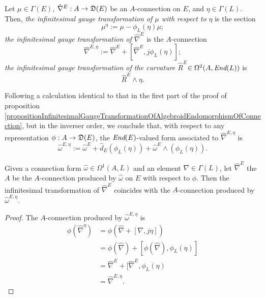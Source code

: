 \begin{definition}\label{definitionInfinitesimalGaugeActionAndTransformationAConnection}
Let $\mu \in \Gamma(E)$, $\hat \nabla^E: A \to \mathfrak{D}(E)$ be an $A$-connection on $E$, and $\eta \in \Gamma(L)$. Then, \emph{the infinitesimal gauge transformation of $\mu$ with respect to $\eta$} is the section
\begin{equation}
    \mu^\eta := \mu - \phi_L(\eta)\mu;
\end{equation}
\emph{the infinitesimal gauge transformation of $\hat \nabla^E$} is the $A$-connection
\begin{equation}
    \hat \nabla^{E, \eta} := \hat \nabla^E + [\hat \nabla^E, j\phi_L(\eta)];
\end{equation}
\emph{the infinitesimal gauge transformation of the curvature $\hat R^E$}$\in \Omega^2(A, \operatorname{\textit{End}}(L))$ is
\begin{equation}
    \hat R^E \wedge \eta.
\end{equation}
\end{definition}

Following a calculation identical to that in the first part of the proof of proposition \ref{propositionInfinitesimalGaugeTransformationOfAlgebroidEndomorphismOfConnection}, but in the inverser order, we conclude that, with respect to any representation $\phi: A \to \alg D(E)$, the $\operatorname{\textit{End}}(E)$-valued form associated to $\hat \nabla^{E, \eta}$ is
\begin{equation}
    \hat \omega^{E, \eta} := \hat \omega^E + \hat d_E(\phi_L(\eta)) + \hat \omega^E \wedge (\phi_L(\eta)).
\end{equation}

\begin{proposition}\label{propositionGaugeActionTransformationAConnectionEqualToCommute}
Given a connection form $\hat \omega \in \Omega^1(A, L)$ and an element $\nabla \in \Gamma(L)$, let $\hat \nabla^E$ the $A$ be the $A$-connection produced by $\hat \omega$ on $E$ with respect to $\phi$. Then the infinitesimal transformation of $\hat \nabla^E$ coincides with the $A$-connection produced by $\hat \omega^{E, \eta}$.
\end{proposition}
\begin{proof}
The $A$-connection produced by $\hat \omega^{E, \eta}$ is
\begin{align*}
    \phi(\hat \nabla^{\eta}) 
        &= \phi(\hat \nabla + [\nabla, j\eta]) \\
        &= \phi(\hat \nabla) + [\phi(\hat \nabla), \phi_L(\eta)]\\
        &= \hat \nabla^E + [\hat \nabla^E, \phi_L(\eta)\\
        &= \hat \nabla^{E, \eta}.
\end{align*}
\end{proof}


